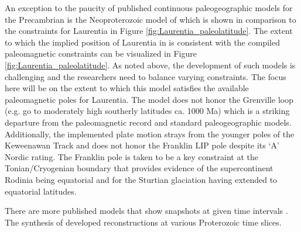 \documentclass[11pt,letterpaper]{article}
\begin{document}
{ An exception to the paucity of published continuous paleogeographic models for the Precambrian is the Neoproterozoic model of \cite{Merdith2017a} which is shown in comparison to the constraints for Laurentia in Figure \ref{fig:Laurentia_paleolatitude}. The extent to which the implied position of Laurentia in \cite{Merdith2017a} is consistent with the compiled paleomagnetic constraints can be visualized in Figure \ref{fig:Laurentia_paleolatitude}. As noted above, the development of such models is challenging and the researchers need to balance varying constraints. The focus here will be on the extent to which this model satisfies the available paleomagnetic poles for Laurentia. The model does not honor the Grenville loop (e.g. go to moderately high southerly latitudes ca. 1000 Ma) which is a striking departure from the paleomagnetic record and standard paleogeographic models. Additionally, the implemented plate motion strays from the younger poles of the Keweenawan Track and does not honor the Franklin LIP pole despite its `A' Nordic rating. The Franklin pole is taken to be a key constraint at the Tonian/Cryogenian boundary that provides evidence of the supercontinent Rodinia being equatorial and for the Sturtian glaciation having extended to equatorial latitudes.

There are more published models that show snapshots at given time intervals \cite[e.g.]{Li2008a}.  The synthesis of \citet{Pesonen2012a} developed reconstructions at various Proterozoic time slices.

}
\end{document}
